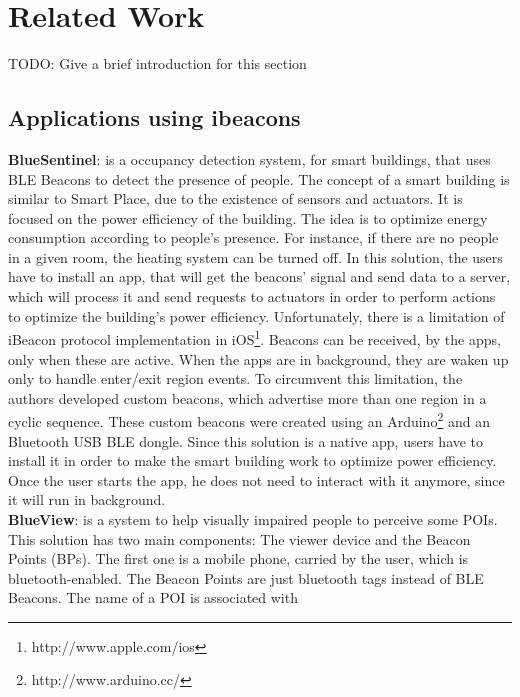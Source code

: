 
\section{Related Work}
\label{sec:related_work}

TODO: Give a brief introduction for this section

\subsection{Applications using ibeacons}
\label{sub:applications_using_ibeacons}
\textbf{BlueSentinel}\cite{bluesentinel}: is a
occupancy detection system, for smart buildings,
that uses BLE Beacons to detect the presence of
people. The concept of a smart building
is similar to Smart Place,
due to the existence of sensors and actuators.
It is focused on the power efficiency of the
building. The idea is to optimize energy
consumption according to people's presence.
For instance, if there are no people in a given room,
the heating system can be turned off.
In this solution, the users have to install
an app, that will get the beacons' signal and
send data to a server, which will process it
and send requests to actuators in order to
perform actions to optimize the
building's power efficiency.
Unfortunately, there is a limitation
of iBeacon protocol implementation
in iOS\footnote{http://www.apple.com/ios}.
Beacons can be received, by the apps,
only when these are active. When the apps are in
background, they are waken up only to handle
enter/exit region events. To circumvent this
limitation, the authors developed custom
beacons, which advertise more than one region
in a cyclic sequence. These custom beacons
were created using an
Arduino\footnote{http://www.arduino.cc/}
and an Bluetooth USB BLE dongle.
Since this solution is a native app,
users have to install it in order
to make the smart building work to
optimize power efficiency.
Once the user starts the app, he does not
need to interact with it anymore, since it
will run in background.
\\
\textbf{BlueView}\cite{blueview}: is a system to help
visually impaired people to perceive some POIs.
This solution has two main components: The viewer device
and the Beacon Points (BPs). The first one is a mobile phone,
carried by the user, which is bluetooth-enabled.
The Beacon Points are just bluetooth tags instead of
BLE Beacons. The name of a POI is associated with
